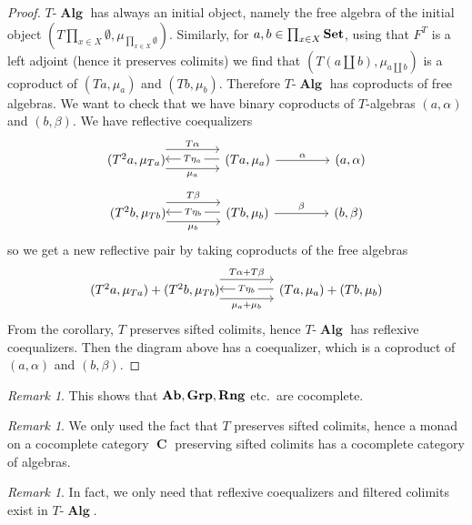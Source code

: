 \documentclass[a4paper,11pt,twoside, openany]{book}
\newcommand{\catname}[1]{{\normalfont\textbf{#1}}}
\DeclareMathOperator{\Alg}{\mathbf{Alg}}
\newcommand{\Set}{\catname{Set}}
\newcommand{\Ab}{\catname{Ab}}
\DeclareMathOperator{\C}{\mathbf{C}}
\theoremstyle{definition}
\theoremstyle{definition}
\theoremstyle{remark}
\newtheorem{rmk}[thm]{Remark}
\begin{document}
	\begin{proof}
		$T\mbox{-}\Alg$ has always an initial object, namely the free algebra of the initial object $\left(T\prod_{x\in X}\emptyset,\mu_{\prod_{x\in X}\emptyset}\right)$. Similarly, for $a,b\in\prod_{x\in X}\Set$, using that $F^T$ is a left adjoint (hence it preserves colimits) we find that $\left(T\left(a\coprod b\right),\mu_{a\coprod b}\right)$ is a coproduct of $(Ta,\mu_a)$ and $(Tb,\mu_b)$. Therefore $T\mbox{-}\Alg$ has coproducts of free algebras. We want to check that we have binary coproducts of $T$-algebras $(a,\alpha)$ and $(b,\beta)$. We have reflective coequalizers
		\[
		\begin{tikzcd}[column sep=1.5cm]
		(T^2a,\mu_{Ta})\hspace{-1.5mm}\arrow[r, shift right=1.5ex, "\mu_a"']  \arrow[r, shift left=2ex, "T\alpha"] & (Ta,\mu_a)\arrow[l, shift right=.25ex, "T\eta_a"description]\arrow[r,"\alpha"]&(a,\alpha)
		\end{tikzcd}
		\]
		\[
		\begin{tikzcd}[column sep=1.5cm]
		(T^2b,\mu_{Tb})\hspace{-1.5mm}\arrow[r, shift right=1.5ex, "\mu_b"']  \arrow[r, shift left=2ex, "T\beta"] & (Tb,\mu_b)\arrow[l, shift right=.25ex, "T\eta_b"description]\arrow[r,"\beta"]&(b,\beta)
		\end{tikzcd}
		\]
		so we get a new reflective pair by taking coproducts of the free algebras
		\[
		\begin{tikzcd}[column sep=1.5cm]
		(T^2a,\mu_{Ta})+(T^2b,\mu_{Tb})\hspace{-1.5mm}\arrow[r, shift right=1.5ex, "\mu_a+\mu_b"']  \arrow[r, shift left=2ex, "T\alpha+T\beta"] & (Ta,\mu_a)+(Tb,\mu_b)\arrow[l, shift right=.25ex, "T\eta_b"description]
		\end{tikzcd}
		\]
		From the corollary, $T$ preserves sifted colimits, hence $T\mbox{-}\Alg$ has reflexive coequalizers. Then the diagram above has a coequalizer, which is a coproduct of $(a,\alpha)$ and $(b,\beta)$. 
	\end{proof}
	\begin{rmk}
		This shows that $\Ab,\mathbf{Grp},\mathbf{Rng}$ etc.\ are cocomplete.
	\end{rmk}
	\begin{rmk}
		We only used the fact that $T$ preserves sifted colimits, hence a monad on a cocomplete category $\C$ preserving sifted colimits has a cocomplete category of algebras.
	\end{rmk}
	\begin{rmk}
		In fact, we only need that reflexive coequalizers and filtered colimits exist in $T\mbox{-}\Alg$.
	\end{rmk}
\end{document}
